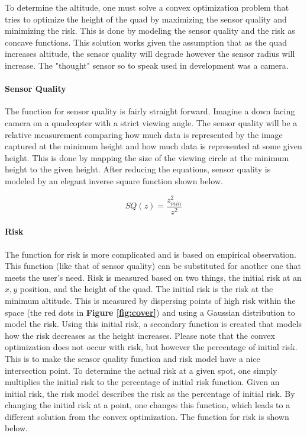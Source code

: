 \documentclass[12pt]{article}
\newcommand{\fig}[1]{\textbf{Figure \ref{fig:#1}}}
\begin{document}
To determine the altitude, one must solve a convex optimization problem that
tries to optimize the height of the quad by maximizing the sensor quality and
minimizing the risk. This is done by modeling the sensor quality and the risk
as concave functions. This solution works given the assumption that as the quad
increases altitude, the sensor quality will degrade however the sensor radius
will increase. The "thought" sensor so to speak used in development was a
camera.

\paragraph{Sensor Quality} The function for sensor quality is fairly straight
forward.  Imagine a down facing camera on a quadcopter with a strict viewing
angle. The sensor quality will be a relative measurement comparing how much
data is represented by the image captured at the minimum height and how much
data is represented at some given height. This is done by mapping the size of
the viewing circle at the minimum height to the given height. After reducing
the equations, sensor quality is modeled by an elegant inverse square function
shown below.

$$ SQ(z) = \frac{z_{min} ^ 2}{z ^ 2} $$

\paragraph{Risk} The function for risk is more complicated and is based on
empirical observation. This function (like that of sensor quality) can be
substituted for another one that meets the user's need. Risk is measured based
on two things, the initial risk at an $x, y$ position, and the height of the
quad. The initial risk is the risk at the minimum altitude. This is measured by
dispersing points of high risk within the space (the red dots in \fig{cover})
and using a Gaussian distribution to model the risk. Using this initial risk, a
secondary function is created that models how the risk decreases as the height
increases. Please note that the convex optimization does not occur with risk,
but however the percentage of initial risk. This is to make the sensor quality
function and risk model have a nice intersection point. To determine the actual
risk at a given spot, one simply multiplies the initial risk to the percentage
of initial risk function. Given an initial risk, the risk model describes the
risk as the percentage of initial risk. By changing the initial risk at a
point, one changes this function, which leads to a different solution from the
convex optimization. The function for risk is shown below.
\end{document}
